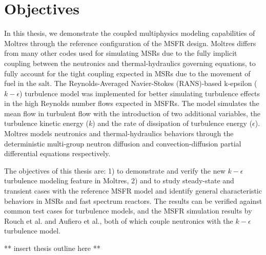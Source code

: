 \section{Objectives}

In this thesis, we demonstrate the coupled multiphysics modeling capabilities
of Moltres through the reference configuration of the MSFR design. Moltres
differs from many other codes used for simulating MSRs due to the fully
implicit coupling between the neutronics and thermal-hydraulics governing
equations, to fully account for the tight coupling expected in MSRs due to the
movement of fuel in the salt. The Reynolds-Averaged Navier-Stokes (RANS)-based
k-epsilon ($k-\epsilon$)
turbulence model was implemented for better simulating turbulence effects in
the high Reynolds number flows expected in MSFRs. The model simulates the mean
flow in turbulent flow with the introduction of two additional variables, the
turbulence kinetic energy ($k$) and the rate of dissipation of turbulence
energy ($\epsilon$). Moltres models
neutronics and thermal-hydraulics behaviors through the deterministic
multi-group neutron diffusion and convection-diffusion partial
differential equations respectively.

The objectives of this thesis are: 1) to demonstrate and verify the new
$k-\epsilon$ turbulence modeling feature in Moltres, 2) and to study
steady-state and transient cases with the reference MSFR model and identify
general characteristic behaviors in MSRs and fast spectrum reactors. The
results can be verified against common test cases for
turbulence models, and the MSFR simulation results by Rouch et al. and Aufiero
et al., both of which couple neutronics with the $k-\epsilon$ turbulence model.

** insert thesis outline here **